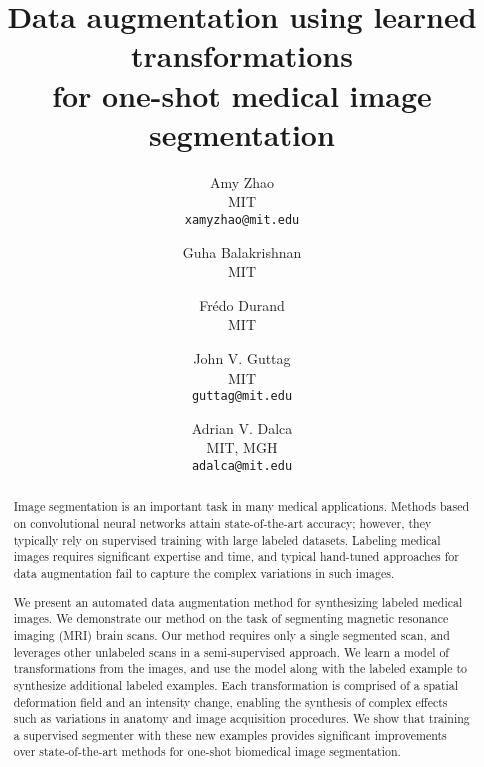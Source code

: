 \documentclass[10pt,twocolumn,letterpaper]{article}
\begin{document}
\title{Data augmentation using learned transformations\\ for one-shot medical image segmentation}

\author{
Amy Zhao\\
MIT\\
{\tt\small xamyzhao@mit.edu}
\and
\hspace{2cm}Guha Balakrishnan\\
\hspace{2cm}MIT\\
\hspace{2cm}{\tt\small balakg@mit.edu} 
\and
\hspace{2cm}Fr\'edo Durand\\
\hspace{2cm}MIT\\
\hspace{2cm}{\tt\small fredo@mit.edu}
\and
John V. Guttag\\
MIT\\
{\tt\small guttag@mit.edu}
\and
Adrian V. Dalca\\
MIT, MGH\\
{\tt\small adalca@mit.edu}\\
}
\maketitle

\begin{abstract}
\vspace{-5pt}
Image segmentation is an important task in many medical applications. Methods based on convolutional neural networks attain state-of-the-art accuracy; however, they typically rely on supervised training with large labeled datasets. Labeling medical images requires significant expertise and time, and typical hand-tuned approaches for data augmentation fail to capture the complex variations in such images. 

We present an automated data augmentation method for synthesizing labeled medical images. We demonstrate our method on the task of segmenting magnetic resonance imaging (MRI) brain scans. Our method requires only a single segmented scan, and leverages other unlabeled scans in a semi-supervised approach. We learn a model of transformations from the images, and use the model along with the labeled example to synthesize additional labeled examples. Each transformation is comprised of a spatial deformation field and an intensity change, enabling the synthesis of complex effects such as variations in anatomy and image acquisition procedures. We show that training a supervised segmenter with these new examples provides significant improvements over state-of-the-art methods for one-shot biomedical image segmentation. 
\end{abstract}
\end{document}
